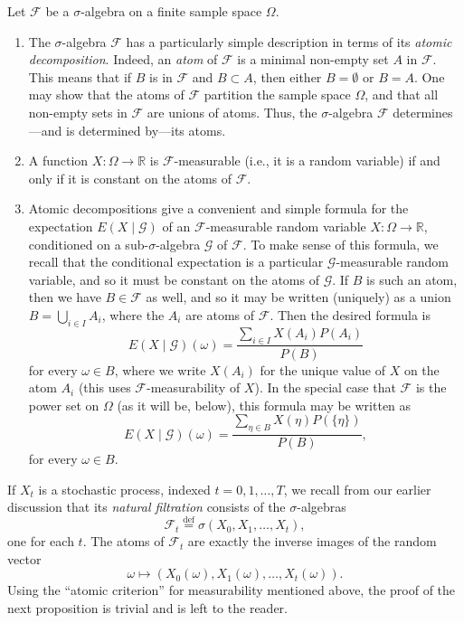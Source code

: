 \documentclass[reqno]{amsart}
\theoremstyle{definition}
\numberwithin{equation}{section}
\begin{document}
Let $\mathcal{F}$ be a $\sigma$-algebra on a finite sample space $\Omega$.
\begin{enumerate}
\item The $\sigma$-algebra $\mathcal{F}$ has a particularly simple description in terms of its \textit{atomic decomposition}. Indeed, an \textit{atom} of  $\mathcal{F}$ is a minimal non-empty set $A$ in $\mathcal{F}$. This means that if $B$ is in $\mathcal{F}$ and $B\subset A$, then either $B=\emptyset$ or $B=A$. One may show that the atoms of $\mathcal{F}$ partition the sample space $\Omega$, and that all non-empty sets in $\mathcal{F}$ are unions of atoms. Thus, the $\sigma$-algebra $\mathcal{F}$ determines---and is determined by---its atoms.

\item A function $X: \Omega \to \mathbb{R}$ is $\mathcal{F}$-measurable (i.e., it is a random variable) if and only if it is constant on the atoms of $\mathcal{F}$.

\item Atomic decompositions give a convenient and simple formula for the expectation $E(X \mid \mathcal{G})$ of an $\mathcal{F}$-measurable random variable $X: \Omega \to \mathbb{R}$, conditioned on a sub-$\sigma$-algebra $\mathcal{G}$ of $\mathcal{F}$. To make sense of this formula, we recall that the conditional expectation is a particular $\mathcal{G}$-measurable random variable, and so it must be constant on the atoms of $\mathcal{G}$. If $B$ is such an atom, then we have $B\in \mathcal{F}$ as well, and so it may be written (uniquely) as a union $B = \bigcup_{i\in I} A_i$, where the $A_i$ are atoms of $\mathcal{F}$. Then the desired formula is
	\[
	E(X \mid \mathcal{G})(\omega) = \frac{\sum_{i\in I} X(A_i)P(A_i)}{P(B)}
	\]
for every $\omega \in B$, where we write $X(A_i)$ for the unique value of $X$ on the atom $A_i$ (this uses $\mathcal{F}$-measurability of $X$). In the special case that $\mathcal{F}$ is the power set on $\Omega$ (as it will be, below), this formula may be written as
	\[
	E(X \mid \mathcal{G})(\omega) = \frac{\sum_{\eta\in B} X(\eta)P(\{\eta\})}{P(B)},
	\]
for every $\omega \in B$.
\end{enumerate}

If $X_t$ is a stochastic process, indexed $t=0,1,\ldots,T$, we recall from our earlier discussion that its \textit{natural filtration} consists of the $\sigma$-algebras
	\[
	\mathcal{F}_t \stackrel{\text{def}}{=} \sigma(X_0,X_1,\ldots,X_t),
	\]
one for each $t$. The atoms of $\mathcal{F}_t$ are exactly the inverse images of the random vector
	\[
	\omega \mapsto (X_0(\omega), X_1(\omega), \ldots, X_t(\omega)).
	\]
Using the ``atomic criterion'' for measurability mentioned above, the proof of the next proposition is trivial and is left to the reader.
	
\end{document}
